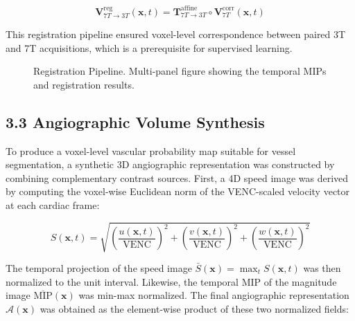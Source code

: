 \documentclass[11pt]{article}
\begin{document}
\begin{equation}
    \mathbf{V}_{7T \to 3T}^{\text{reg}}(\mathbf{x}, t) = \mathbf{T}^{\text{affine}}_{7T \to 3T} \circ \mathbf{V}_{7T}^{\text{corr}}(\mathbf{x}, t)
\end{equation}

This registration pipeline ensured voxel-level correspondence between paired 3T and 7T acquisitions, which is a prerequisite for supervised learning.

\begin{figure}[!htbp]
    \centering
    \caption{Registration Pipeline. Multi-panel figure showing the temporal MIPs and registration results.}
    \label{fig:registration}
\end{figure}

\subsection*{3.3 Angiographic Volume Synthesis}

To produce a voxel-level vascular probability map suitable for vessel segmentation, a synthetic 3D angiographic representation was constructed by combining complementary contrast sources. First, a 4D speed image was derived by computing the voxel-wise Euclidean norm of the VENC-scaled velocity vector at each cardiac frame:

\begin{equation}
    S(\mathbf{x}, t) = \sqrt{
        \left(\frac{u(\mathbf{x},t)}{\text{VENC}}\right)^2 +
        \left(\frac{v(\mathbf{x},t)}{\text{VENC}}\right)^2 +
        \left(\frac{w(\mathbf{x},t)}{\text{VENC}}\right)^2
    }
\end{equation}

The temporal projection of the speed image $\bar{S}(\mathbf{x}) = \max_t S(\mathbf{x}, t)$ was then normalized to the unit interval. Likewise, the temporal MIP of the magnitude image $\overline{\text{MIP}}(\mathbf{x})$ was min-max normalized. The final angiographic representation $\mathcal{A}(\mathbf{x})$ was obtained as the element-wise product of these two normalized fields:
\end{document}
